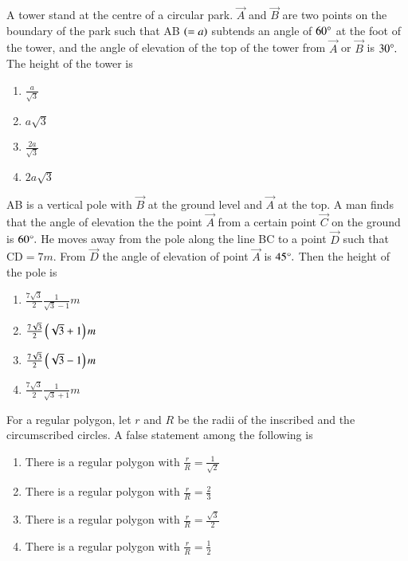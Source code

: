 \item A tower stand at the centre of a circular park. $\vec{A}$ and $\vec{B}$ are two points on the boundary of the park such that AB $\left(=a\right)$ subtends an angle of $60\degree$ at the foot of the tower, and the angle of elevation of the top of the tower from $\vec{A}$ or $\vec{B}$ is $30\degree.$ The height of the tower is \hfill{}
\begin{multicols}{4}
\begin{enumerate}
        \item $\frac{a}{\sqrt{3}}$                    
        \item $a\sqrt{3}$ 
        \item $\frac{2a}{\sqrt{3}}$ 
        \item $2a\sqrt{3}$
\end{enumerate}
\end{multicols} 

\item AB is a vertical pole with $\vec{B}$ at the ground level and $\vec{A}$ at the top. A man finds that the angle of elevation the the point $\vec{A}$ from a certain point $\vec{C}$ on the ground is $60\degree.$ He moves away from the pole along the line BC to a point $\vec{D}$ such that $\text{CD}=7m.$ From $\vec{D}$ the angle of elevation of point $\vec{A}$ is $45\degree.$ Then the height of the pole is  

\hfill{}
\begin{multicols}{4}
\begin{enumerate}
        \item $\frac{7\sqrt{3}}{2}\frac{1}{\sqrt{3}-1}m$          
        \item $\frac{7\sqrt{3}}{2}\left(\sqrt{3}+1\right)m$ 
        \item $\frac{7\sqrt{3}}{2}\left(\sqrt{3}-1\right)m$ 
        \item $\frac{7\sqrt{3}}{2}\frac{1}{\sqrt{3}+1}m$
\end{enumerate}
\end{multicols} 

\item For a regular polygon, let $r$ and $R$ be the radii of the inscribed and the circumscribed circles. A false statement among the following is \hfill{}
\begin{enumerate}
        \item There is a regular polygon with $\frac{r}{R}=\frac{1}{\sqrt{2}}$                    
        \item There is a regular polygon with $\frac{r}{R}=\frac{2}{3}$ 
        \item There is a regular polygon with $\frac{r}{R}=\frac{\sqrt{3}}{2}$ 
        \item There is a regular polygon with $\frac{r}{R}=\frac{1}{2}$
\end{enumerate}

